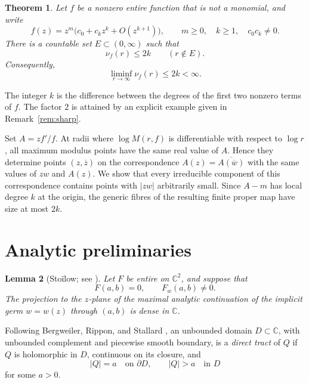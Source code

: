 \documentclass[11pt]{article}
\newtheorem{theorem}{Theorem}[section]
\newtheorem{lemma}[theorem]{Lemma}
\theoremstyle{remark}
\numberwithin{equation}{section}
\newcommand{\C}{\mathbb C}
\begin{document}
\begin{theorem}\label{thm:main}
Let \(f\) be a nonzero entire function that is not a monomial, and write
\begin{equation}\label{eq:taylor}
 f(z)=z^m\bigl(c_0+c_kz^k+O(z^{k+1})\bigr),
 \qquad m\ge0,\quad k\ge1,\quad c_0c_k\ne0.
\end{equation}
There is a countable set \(E\subset(0,\infty)\) such that
\begin{equation}\label{eq:main-bound}
 \nu_f(r)\le2k\qquad(r\notin E).
\end{equation}
Consequently,
\[
 \liminf_{r\to\infty}\nu_f(r)\le2k<\infty.
\]
\end{theorem}

The integer \(k\) is the difference between the degrees of the first
two nonzero terms of \(f\). The factor \(2\) is attained by an explicit
example given in Remark~\ref{rem:sharp}.

Set \(A=zf'/f\). At radii where \(\log M(r,f)\) is differentiable
with respect to \(\log r\), all maximum modulus points have the same
real value of \(A\). Hence they determine points \((z,\overline z)\)
on the correspondence \(A(z)=\overline{A(\overline w)}\) with the same
values of \(zw\) and \(A(z)\). We show that every irreducible component
of this correspondence contains points with \(|zw|\) arbitrarily small.
Since \(A-m\) has local degree \(k\) at the origin, the generic fibres
of the resulting finite proper map have size at most \(2k\).

\section{Analytic preliminaries}\label{sec:facts}

\begin{lemma}[Sto\"ilow; see \cite{Eremenko}]\label{lem:continuation}
Let \(F\) be entire on \(\C^2\), and suppose that
\[
 F(a,b)=0,\qquad F_w(a,b)\ne0.
\]
The projection to the \(z\)-plane of the maximal analytic continuation
of the implicit germ \(w=w(z)\) through \((a,b)\) is dense in \(\C\).
\end{lemma}

Following Bergweiler, Rippon, and Stallard
\cite[Definition 2.1]{BRS}, an unbounded domain \(D\subset\C\), with
unbounded complement and piecewise smooth boundary, is a
\emph{direct tract} of \(Q\) if \(Q\) is holomorphic in \(D\),
continuous on its closure, and
\[
 |Q|=a\quad\text{on }\partial D,
 \qquad |Q|>a\quad\text{in }D
\]
for some \(a>0\).
\end{document}
